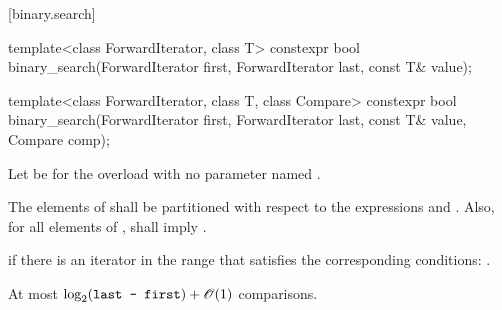 [binary.search]{}

%
\begin{itemdecl}
template<class ForwardIterator, class T>
  constexpr bool
    binary_search(ForwardIterator first, ForwardIterator last,
                  const T& value);

template<class ForwardIterator, class T, class Compare>
  constexpr bool
    binary_search(ForwardIterator first, ForwardIterator last,
                  const T& value, Compare comp);
\end{itemdecl}

\begin{itemdescr}
\begin{newnewblock}
\pnum
Let  be  for the overload with no parameter
named .
\end{newnewblock}

\pnum
\requires
The elements
of
shall be partitioned with respect to the expressions
and
.
Also, for all elements
of
\tcode{[first, last)},
shall imply
.

\pnum
\returns
{}
if  there is an iterator
in the range
that satisfies the corresponding conditions:
.

\pnum
\complexity
At most
$\log_2(\texttt{last - first}) + \mathscr{O}(1)$
comparisons.
\end{itemdescr}

